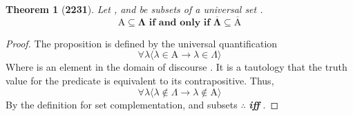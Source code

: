 \documentclass[preview]{standalone}
\newtheorem*{theorem*}{Theorem}
\begin{document}
\begin{theorem*}[\textbf{2231}] \color{black}
    Let , and \bm{$\Lambda$} be subsets of a universal set \bm{$\Omega$}. 
    \begin{equation*}
        \bm{
            \mathrm{A} \subseteq \Lambda
                \text{ if and only if } 
            \overline{\Lambda} \subseteq \overline{\mathrm{A}}
            }
    \end{equation*}
\end{theorem*}
\begin{proof} \color{black}
    The proposition  is defined by the universal quantification%
    \begin{equation*}
        \forall \lambda \Big \langle \lambda \in \mathrm{A} \rightarrow \lambda \in \Lambda \Big \rangle
    \end{equation*}
    Where \bm{$\lambda$} is an element in the domain of discourse \bm{$\Omega$}.
    It is a tautology that the truth value for the predicate is equivalent to its contrapositive. 
    Thus,  
    \begin{equation*}
        \forall \lambda \Big \langle \lambda \notin \Lambda \rightarrow \lambda \notin \mathrm{A} \Big \rangle
    \end{equation*} 
    By the definition for set complementation, and subsets
    $\therefore$  \textbf{\emph{ iff }} .
\color{lightgray} \end{proof}
\end{document}
